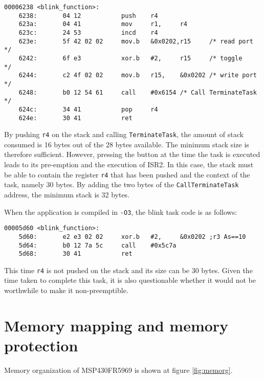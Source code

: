 \documentclass[11pt, oneside]{article}   	%
\begin{document}
\begin{lstlisting}[basicstyle=\footnotesize\ttfamily]
00006238 <blink_function>:
    6238:       04 12           push    r4              
    623a:       04 41           mov     r1,     r4      
    623c:       24 53           incd    r4              
    623e:       5f 42 02 02     mov.b   &0x0202,r15     /* read port  */
    6242:       6f e3           xor.b   #2,     r15     /* toggle     */
    6244:       c2 4f 02 02     mov.b   r15,    &0x0202 /* write port */
    6248:       b0 12 54 61     call    #0x6154 /* Call TerminateTask */
    624c:       34 41           pop     r4              
    624e:       30 41           ret                     
\end{lstlisting}

By pushing \lstinline{r4} on the stack and calling \lstinline{TerminateTask}, the amount of stack consumed is 16 bytes out of the 28 bytes available. The minimum stack size is therefore sufficient. However, pressing the button at the time the task is executed leads to its pre-emption and the execution of ISR2. In this case, the stack must be able to contain the register \lstinline{r4} that has been pushed and the context of the task, namely 30 bytes. By adding the two bytes of the \lstinline{CallTerminateTask} address, the minimum stack is 32 bytes.

When the application is compiled in \lstinline{-O3}, the blink task code is as follows:

\begin{lstlisting}[basicstyle=\footnotesize\ttfamily]
00005d60 <blink_function>:
    5d60:       e2 e3 02 02     xor.b   #2,     &0x0202 ;r3 As==10
    5d64:       b0 12 7a 5c     call    #0x5c7a 
    5d68:       30 41           ret                     
\end{lstlisting}

This time \lstinline{r4} is not pushed on the stack and its size can be 30 bytes. Given the time taken to complete this task, it is also questionable whether it would not be worthwhile to make it non-preemptible.

\section{Memory mapping and memory protection}

Memory organization of MSP430FR5969 is shown at figure \ref{fig:memorg}. 
\end{document}
